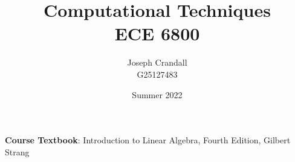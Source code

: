 
\usepackage{algorithm, algpseudocode, bm, color, gensymb, listings, siunitx, soul, subfiles, verbatim}
\usepackage[a4paper, total={7.5in, 10in}]{geometry}

\title{Computational Techniques\\
\large ECE 6800}
\author{Joseph Crandall\\
G25127483}
\date{Summer 2022}


\maketitle

\textbf{Course Textbook}: Introduction to Linear Algebra, Fourth Edition, Gilbert Strang

\begin{comment}

\section{Lecture 1}


\section{Hw 1}


\section{Lecture 2}


\section{Hw 2}


\section{Lecture 3}


\section{HW 3}


\section{Lecture 4}


\section{HW 4}



\end{comment}
